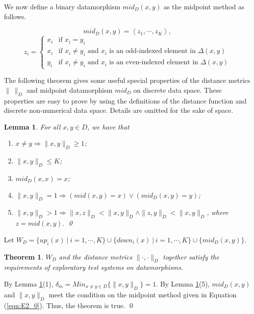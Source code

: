 \documentclass[preprint,1p,authoryear,times]{elsarticle}
\newtheorem{Theorem} {Theorem}
\newtheorem{Lemma}{Lemma}
\begin{document}
We now define a binary datamorphism $mid_D(x,y)$ as the midpoint method as follows.

\begin{equation}
mid_D(x,y)= \left<z_1,\cdots, z_K\right>,
\end{equation}
\begin{equation}
z_i=\left\{\begin{array}{ll}
 x_i & \textrm{if $x_i = y_i$}\\
 x_i & \textrm{if $x_i \neq y_i$ and $x_i$ is an odd-indexed element in $\Delta(x,y)$} \\
 y_i & \textrm{if $x_i \neq y_i$ and $x_i$ is an even-indexed element in $\Delta(x,y)$}
\end{array} \right.
\label{eqn:e2_3}
\end{equation}

The following theorem gives some useful special properties of the distance metrics $\| ~ \|_D$ and midpoint datamorphism $mid_D$ on discrete data space. These properties are easy to prove by using the definitions of the distance function and discrete non-numerical data space. Details are omitted for the sake of space. 

\begin{Lemma}\label{lmm:Lmm2_2}
For all $x,y \in D$, we have that 
\begin{enumerate}
\item $x \neq y \Rightarrow \|x,y\|_D \geq 1$;
\item $\|x,y\|_D \leq K$;
\item $mid_D(x,x)=x$;
\item $\|x,y\|_D = 1 \Rightarrow (mid(x,y)=x) \vee (mid_D(x,y)=y)$;
\item $\|x,y\|_D > 1 \Rightarrow \|x,z\|_D < \|x,y\|_D \wedge \|z,y\|_D < \|x,y\|_D$, where $z=mid(x,y)$. \qed
\end{enumerate}
\end{Lemma}

Let $W_D = \{ up_i(x) ~|~ i=1, \cdots, K\} \cup \{down_i(x) ~|~ i=1, \cdots, K\} \cup \{mid_D(x, y)\}$. 

\begin{Theorem}\label{thm:Thm2_1}
$W_D$ and the distance metrics $\|\cdot,\cdot\|_D$ together satisfy the requirements of exploratory test systems on datamorphisms. 
\end{Theorem}
 By Lemma \ref{lmm:Lmm2_2}(1), $\delta_m = Min_{ x\neq y\in D}\{\|x,y\|_D\} = 1$. By Lemma \ref{lmm:Lmm2_2}(5), $mid_D(x,y)$ and $\|x,y\|_D$ meet the condition on the midpoint method given in Equation (\ref{eqn:E2_0}). Thus, the theorem is true. \qed
\end{document}
